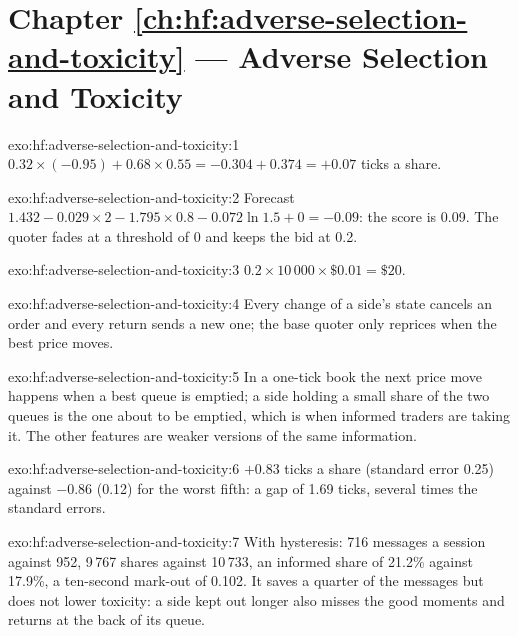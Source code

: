 \section*{Chapter \ref{ch:hf:adverse-selection-and-toxicity} --- Adverse Selection and Toxicity}

\begin{solution}{exo:hf:adverse-selection-and-toxicity:1}
$0.32\times(-0.95)+0.68\times0.55=-0.304+0.374=+0.07$ ticks a share.
\end{solution}

\begin{solution}{exo:hf:adverse-selection-and-toxicity:2}
Forecast $1.432-0.029\times2-1.795\times0.8-0.072\ln1.5+0=-0.09$: the score is 0.09. The quoter fades at a threshold of 0 and keeps the bid at 0.2.
\end{solution}

\begin{solution}{exo:hf:adverse-selection-and-toxicity:3}
$0.2\times10\,000\times\$0.01=\$20$.
\end{solution}

\begin{solution}{exo:hf:adverse-selection-and-toxicity:4}
Every change of a side's state cancels an order and every return sends a new one; the base quoter only reprices when the best price moves.
\end{solution}

\begin{solution}{exo:hf:adverse-selection-and-toxicity:5}
In a one-tick book the next price move happens when a best queue is emptied; a side holding a small share of the two queues is the one about to be
emptied, which is when informed traders are taking it. The other features are weaker versions of the same information.
\end{solution}

\begin{solution}{exo:hf:adverse-selection-and-toxicity:6}
$+0.83$ ticks a share (standard error 0.25) against $-0.86$ (0.12) for the worst fifth: a gap of 1.69 ticks, several times the standard errors.
\end{solution}

\begin{solution}{exo:hf:adverse-selection-and-toxicity:7}
With hysteresis: 716 messages a session against 952, 9\,767 shares against 10\,733, an informed share of 21.2\% against 17.9\%, a ten-second mark-out
of 0.102. It saves a quarter of the messages but does not lower toxicity: a side kept out longer also misses the good moments and returns at the back
of its queue.
\end{solution}

